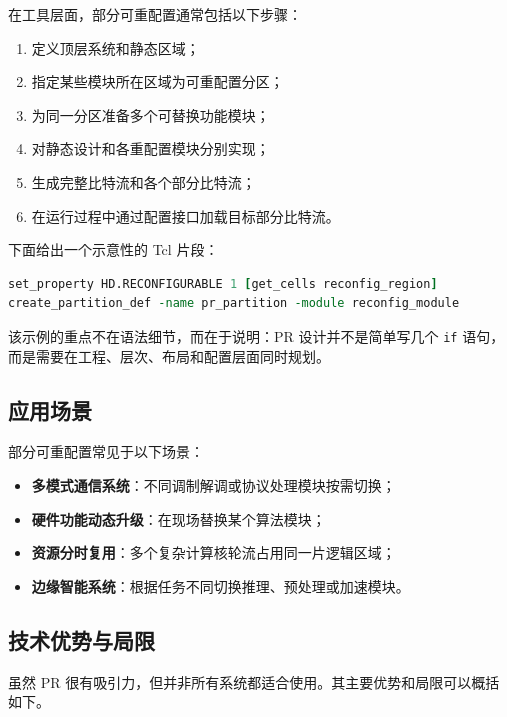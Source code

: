 在工具层面，部分可重配置通常包括以下步骤：

\begin{enumerate}
\def\labelenumi{\arabic{enumi}.}
\tightlist
\item
  定义顶层系统和静态区域；
\item
  指定某些模块所在区域为可重配置分区；
\item
  为同一分区准备多个可替换功能模块；
\item
  对静态设计和各重配置模块分别实现；
\item
  生成完整比特流和各个部分比特流；
\item
  在运行过程中通过配置接口加载目标部分比特流。
\end{enumerate}

下面给出一个示意性的 Tcl 片段：

\begin{lstlisting}[language=tcl]
set_property HD.RECONFIGURABLE 1 [get_cells reconfig_region]
create_partition_def -name pr_partition -module reconfig_module
\end{lstlisting}

该示例的重点不在语法细节，而在于说明：PR 设计并不是简单写几个
\passthrough{\lstinline!if!}
语句，而是需要在工程、层次、布局和配置层面同时规划。

\subsection{应用场景}\label{ux5e94ux7528ux573aux666f}

部分可重配置常见于以下场景：

\begin{itemize}
\tightlist
\item
  \textbf{多模式通信系统}：不同调制解调或协议处理模块按需切换；
\item
  \textbf{硬件功能动态升级}：在现场替换某个算法模块；
\item
  \textbf{资源分时复用}：多个复杂计算核轮流占用同一片逻辑区域；
\item
  \textbf{边缘智能系统}：根据任务不同切换推理、预处理或加速模块。
\end{itemize}

\subsection{技术优势与局限}\label{ux6280ux672fux4f18ux52bfux4e0eux5c40ux9650}

虽然 PR
很有吸引力，但并非所有系统都适合使用。其主要优势和局限可以概括如下。

